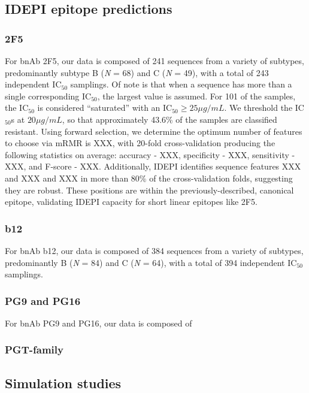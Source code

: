 \documentclass[10pt]{article}
\newcommand{\hmic}{{IC}$_{50}$}
\newcommand{\idepi}{{IDEPI}}
\newcommand{\N}{\emph{N}}
\newcommand{\mrmr}{{mRMR}}
\begin{document}
\subsection*{\idepi{} epitope predictions}

\subsubsection*{2F5}
For bnAb 2F5, our data is composed of 241 sequences from a variety of subtypes,
predominantly subtype B (\N{} = 68) and C (\N{} = 49),
with a total of 243 independent \hmic{} samplings.
Of note is that when a sequence has more than a single corresponding \hmic{},
the largest value is assumed.
For 101 of the samples, the \hmic{} is considered ``saturated'' with an $\textrm{{IC}}_{50} \ge 25{\mu}g/mL$.
We threshold the \hmic{}s at $20{\mu}g/mL$,
so that approximately 43.6\% of the samples are classified resistant.
Using forward selection, we determine the optimum number of features to choose via \mrmr{} is XXX,
with 20-fold cross-validation producing the following statistics on average:
accuracy - XXX,
specificity - XXX,
sensitivity - XXX,
and F-score - XXX.
Additionally, \idepi{} identifies sequence features XXX and XXX and XXX in more than 80\% of the cross-validation folds,
suggesting they are robust.
These positions are within the previously-described, canonical epitope,
validating \idepi{} capacity for short linear epitopes like 2F5.

\subsubsection*{b12}
For bnAb b12, our data is composed of 384 sequences from a variety of subtypes,
predominantly B (\N{} = 84) and C (\N{} = 64),
with a total of 394 independent \hmic{} samplings.

\subsubsection*{PG9 and PG16}
For bnAb PG9 and PG16, our data is composed of 
\subsubsection*{PGT-family}



\subsection*{Simulation studies}
\end{document}
